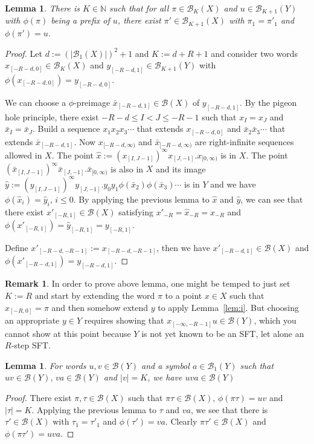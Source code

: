\documentclass[a4paper]{amsart}
\newtheorem{lem}[thm]{Lemma}
\theoremstyle{definition}
\newtheorem{remark}{Remark}[section]
\numberwithin{equation}{section}
\numberwithin{figure}{section}
\theoremstyle{definition}
\theoremstyle{remark}
\begin{document}
\begin{lem}
  There is $K \in \mathbb N$ such that for all $\pi \in \mathcal
  B_K(X)$ and $u \in \mathcal B_{K+1}(Y)$ with $\phi(\pi)$ being a prefix
  of $u$, there exist $\pi' \in \mathcal B_{K+1}(X)$ with
  $\pi_1 = \pi'_1$ and $\phi(\pi') = u$.
\end{lem}
\begin{proof}
  Let $d := (|\mathcal B_1(X)|)^2 +1$ and $ K := d+R+1$ and consider two words
  $x_{[-R-d,0]} \in \mathcal B_K(X)$ and $ y_{[-R-d,1]} \in \mathcal
  B_{K+1}(Y)$ with $\phi(x_{[-R-d,0]}) = y_{[-R-d,0]}$.

  We can choose a $\phi$-preimage $\bar x_{[-R-d,1]} \in \mathcal B(X)$
  of $y_{[-R-d,1]}$. By the pigeon hole principle, there exist $-R-d\le I
  < J \le -R-1$ such that $x_I = x_J$ and $ \bar x_I = \bar x_J$. Build
  a sequence $x_1x_2x_3\cdots$ that extends $x_{[-R-d,0]}$ and $\bar
  x_2 \bar x_3\cdots$ that extends $\bar x_{[-R-d,1]}$.  Now
  $x_{[-R-d,\infty)}$ and $ \bar x_{[-R-d,\infty)}$ are right-infinite
  sequences allowed in $X$.  The point $\hat x :=
  (x_{[I,J-1]})^\infty x_{[J,-1]}.x_{[0,\infty)}$ is in $X$. The
  point $(\bar x_{[I,J-1]})^\infty\bar x_{[J,-1]}.\bar x_{[0,\infty)}$
  is also in $X$ and its image $\hat y :=
  (y_{[I,J-1]})^\infty y_{[J,-1]}.y_0y_1\phi(\bar x_2)\phi(\bar
  x_3)\cdots$ is in $Y$ and we have $\phi(\hat x_i) = \hat y_i,\,
  i\le0$.  By applying the previous lemma to $\hat x$ and $\hat y$, we can see that
  there exist $x'_{[-R,1]} \in \mathcal B(X)$ satisfying $x'_{-R} =
  \hat x_{-R} = x_{-R}$ and $\phi(x'_{[-R,1]}) = \hat y_{[-R,1]} =
  y_{[-R,1]}$.

  Define $x'_{[-R-d,-R-1]} := x_{[-R-d,-R-1]}$, then we have
  $x'_{[-R-d,1]} \in \mathcal B(X)$ and $\phi(x'_{[-R-d,1]}) =
  y_{[-R-d,1]}$.
\end{proof}
\begin{remark}
  In order to prove above lemma, one might be temped to just set $ K := R $ and start by extending the word $\pi$ to a point $x \in X$ such that $ x_{[-R,0]} = \pi $  and then somehow extend $y$ to apply Lemma~\ref{lem:i}. But choosing an appropriate $y \in Y$ requires showing that $ x_{[-\infty, -R-1]} u \in {\mathcal B}(Y) $, which you cannot show at this point because $ Y $ is not yet known to be an SFT, let alone an $R$-step SFT.
\end{remark}

\begin{lem}
  For words $u,v \in {\mathcal B}(Y)$ and a symbol $a \in {\mathcal B}_1(Y)$ such that $uv \in \mathcal B(Y),\, va \in \mathcal
  B(Y)$ and $ |v| = K$, we have $uva \in \mathcal B(Y)$
\end{lem}
\begin{proof}
  There exist $\pi,\tau \in {\mathcal B}(X)$ such that $\pi\tau\in\mathcal B(X),\,
  \phi(\pi\tau) = uv$ and $ |\tau| = K$.  Applying the previous lemma to $\tau$ and
  $va$, we see that there is $\tau' \in \mathcal B(X)$ with $\tau_1 =
  \tau'_1$ and $\phi(\tau') = va$. Clearly $\pi\tau' \in \mathcal
  B(X)$ and $\phi(\pi\tau') = uva$.
\end{proof}
\end{document}
